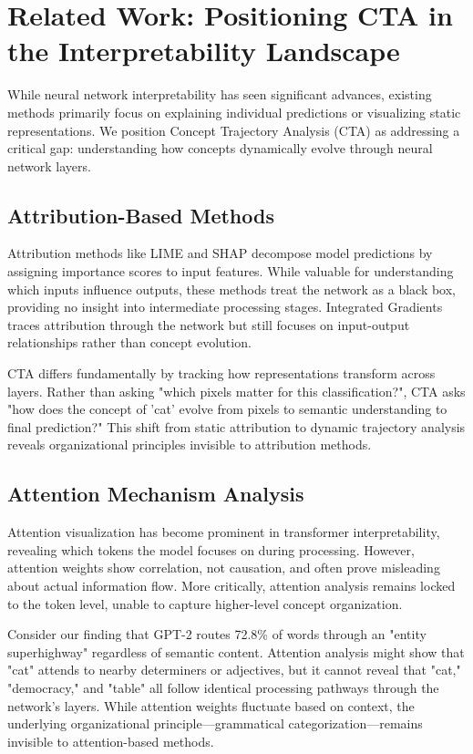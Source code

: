 \section{Related Work: Positioning CTA in the Interpretability Landscape}

While neural network interpretability has seen significant advances, existing methods primarily focus on explaining individual predictions or visualizing static representations. We position Concept Trajectory Analysis (CTA) as addressing a critical gap: understanding how concepts dynamically evolve through neural network layers.

\subsection{Attribution-Based Methods}

Attribution methods like LIME \citep{ribeiro2016} and SHAP \citep{lundberg2017} decompose model predictions by assigning importance scores to input features. While valuable for understanding which inputs influence outputs, these methods treat the network as a black box, providing no insight into intermediate processing stages. Integrated Gradients \citep{sundararajan2017} traces attribution through the network but still focuses on input-output relationships rather than concept evolution.

CTA differs fundamentally by tracking how representations transform across layers. Rather than asking "which pixels matter for this classification?", CTA asks "how does the concept of 'cat' evolve from pixels to semantic understanding to final prediction?" This shift from static attribution to dynamic trajectory analysis reveals organizational principles invisible to attribution methods.

\subsection{Attention Mechanism Analysis}

Attention visualization has become prominent in transformer interpretability, revealing which tokens the model focuses on during processing. However, attention weights show correlation, not causation, and often prove misleading about actual information flow. More critically, attention analysis remains locked to the token level, unable to capture higher-level concept organization.

Consider our finding that GPT-2 routes 72.8\% of words through an "entity superhighway" regardless of semantic content. Attention analysis might show that "cat" attends to nearby determiners or adjectives, but it cannot reveal that "cat," "democracy," and "table" all follow identical processing pathways through the network's layers. While attention weights fluctuate based on context, the underlying organizational principle—grammatical categorization—remains invisible to attention-based methods.

